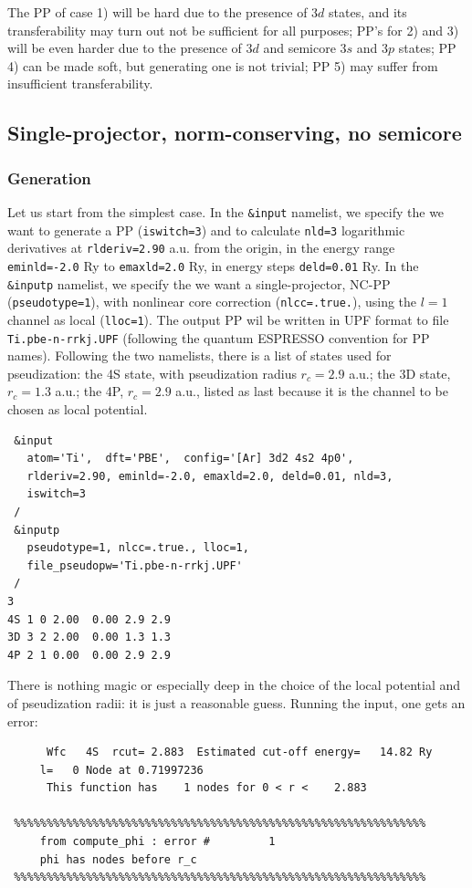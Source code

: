 \documentclass[12pt,a4paper]{article}
\begin{document}
The PP of case 1) will be hard due to the presence of $3d$ states, and 
its transferability may turn out not be sufficient for all purposes;
PP's for 2) and 3) will be even harder due to the presence of $3d$ and
semicore $3s$ and $3p$ states; PP 4) can be made soft, but generating
one is not trivial; PP 5) may suffer from insufficient transferability.

\subsection {Single-projector, norm-conserving, no semicore}

\subsubsection{Generation}
Let us start from the simplest case. In the \texttt{\&input} namelist,
we specify the we want to generate a PP (\texttt{iswitch=3}) and to
calculate \texttt{nld=3} logarithmic derivatives at \texttt{rlderiv=2.90} a.u.
from the origin, in the energy range \texttt{eminld=-2.0} Ry to 
\texttt{emaxld=2.0} Ry, in energy steps \texttt{deld=0.01} Ry.
In the \texttt{\&inputp} namelist, we specify the we want a single-projector,
NC-PP (\texttt{pseudotype=1}), with nonlinear core correction 
(\texttt{nlcc=.true.}), using the $l=1$ channel as local (\texttt{lloc=1}).
The output PP wil be written in UPF format to file \texttt{Ti.pbe-n-rrkj.UPF}
(following the {\sc quantum ESPRESSO} convention for PP names).
Following the two namelists, there is a list of states used for pseudization:
the 4S state, with pseudization radius $r_c=2.9$ a.u.; the 3D state,
 $r_c=1.3$ a.u.; the 4P, $r_c=2.9$ a.u.,  listed as last because it is
the channel to be chosen as local potential.
\begin{verbatim}
 &input
   atom='Ti',  dft='PBE',  config='[Ar] 3d2 4s2 4p0',
   rlderiv=2.90, eminld=-2.0, emaxld=2.0, deld=0.01, nld=3,
   iswitch=3
 /
 &inputp
   pseudotype=1, nlcc=.true., lloc=1,
   file_pseudopw='Ti.pbe-n-rrkj.UPF'
 /
3
4S 1 0 2.00  0.00 2.9 2.9
3D 3 2 2.00  0.00 1.3 1.3
4P 2 1 0.00  0.00 2.9 2.9
\end{verbatim}
There is nothing magic or especially deep in the choice of the local 
potential and of pseudization radii: it is just a reasonable guess.
Running the input, one gets an error:
\begin{verbatim}
      Wfc   4S  rcut= 2.883  Estimated cut-off energy=   14.82 Ry
     l=   0 Node at 0.71997236
      This function has    1 nodes for 0 < r <    2.883

 %%%%%%%%%%%%%%%%%%%%%%%%%%%%%%%%%%%%%%%%%%%%%%%%%%%%%%%%%%%%%%%
     from compute_phi : error #         1
     phi has nodes before r_c
 %%%%%%%%%%%%%%%%%%%%%%%%%%%%%%%%%%%%%%%%%%%%%%%%%%%%%%%%%%%%%%%
\end{verbatim}
\end{document}
